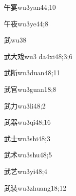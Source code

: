 \begin{verbete}{午宴}{wu3yan4}{4;10}
\end{verbete}

\begin{verbete}{午夜}{wu3ye4}{4;8}
\end{verbete}

\begin{verbete}{武}{wu3}{8}
\end{verbete}

\begin{verbete}{武大戏}{wu3 da4xi4}{8;3;6}
\end{verbete}

\begin{verbete}{武断}{wu3duan4}{8;11}
\end{verbete}

\begin{verbete}{武官}{wu3guan1}{8;8}
\end{verbete}

\begin{verbete}{武力}{wu3li4}{8;2}
\end{verbete}

\begin{verbete}{武器}{wu3qi4}{8;16}
\end{verbete}

\begin{verbete}{武士}{wu3shi4}{8;3}
\end{verbete}

\begin{verbete}{武术}{wu3shu4}{8;5}
\end{verbete}

\begin{verbete}{武艺}{wu3yi4}{8;4}
\end{verbete}

\begin{verbete}{武装}{wu3zhuang1}{8;12}
\end{verbete}

